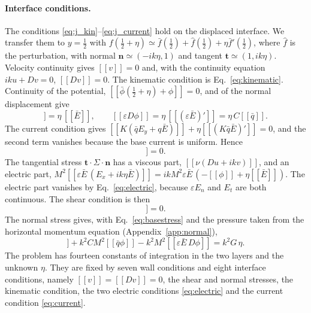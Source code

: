 \documentclass[aip,pof,reprint,amsmath,amssymb]{revtex4-2}
\newcommand{\jump}[1]{[\![#1]\!]}
\begin{document}
\paragraph*{Interface conditions.}
The conditions \eqref{eq:j_kin}--\eqref{eq:j_current} hold on the displaced interface.
We transfer them to $y=\tfrac12$ with $f(\tfrac12+\eta)\simeq\bar f(\tfrac12)+\hat f(\tfrac12)+
\eta\bar f'(\tfrac12)$, where $\hat f$ is the perturbation, with normal $\bm n\simeq(-ik\eta,1)$ and tangent
$\bm t\simeq(1,ik\eta)$. Velocity continuity gives $\jump v=0$ and, with the continuity
equation $iku+Dv=0$, $\jump{Dv}=0$. The kinematic condition is
Eq.~\eqref{eq:kinematic}. Continuity of the potential, $\jump{\bar\phi(\tfrac12+\eta)+\phi}=0$,
and of the normal displacement give
\begin{equation}
\jump\phi=\eta\,\jump{\bar E},\qquad \jump{\varepsilon D\phi}=\eta\,\jump{(\varepsilon\bar E)'}
=\eta\,C\jump{\bar q}.
\label{eq:electric}
\end{equation}
The current condition gives $\jump{K(\bar qE_y+q\bar E)}+\eta\jump{(K\bar q\bar E)'}=0$, and
the second term vanishes because the base current is uniform. Hence
\begin{equation}
\jump{K(\bar Eq-\bar q\,D\phi)}=0 .
\label{eq:current}
\end{equation}
The tangential stress $\bm t\cdot\Sigma\cdot\bm n$ has a viscous part,
$\jump{\nu(Du+ikv)}$, and an electric part,
$M^2\jump{\varepsilon\bar E\,(E_x+ik\eta\bar E)}=ikM^2\varepsilon\bar E\,(-\jump\phi+
\eta\jump{\bar E})$. The electric part vanishes by Eq.~\eqref{eq:electric}, because
$\varepsilon E_n$ and $E_t$ are both continuous. The shear condition is then
\begin{equation}
\jump{\nu(\zeta+2k^2v)}=0 .
\end{equation}
The normal stress gives, with Eq.~\eqref{eq:basestress} and the pressure taken from the
horizontal momentum equation (Appendix~\ref{app:normal}),
\begin{equation}
\jump{-\nu D\zeta+2\nu k^2Dv}+k^2CM^2\jump{\bar q\phi}-k^2M^2\jump{\varepsilon\bar E\,D\phi}
=k^2G\,\eta .
\label{eq:normalstress}
\end{equation}
The problem has fourteen constants of integration in the two layers and the unknown $\eta$.
They are fixed by seven wall conditions and eight interface conditions, namely
$\jump v=\jump{Dv}=0$, the shear and normal stresses, the kinematic condition, the two
electric conditions \eqref{eq:electric} and the current condition \eqref{eq:current}.
\end{document}
